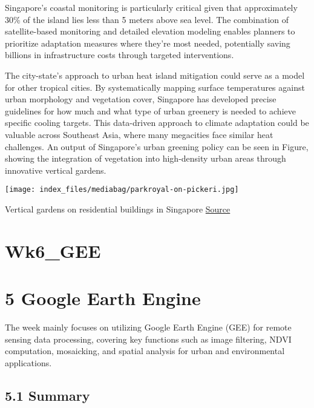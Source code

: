 \documentclass[
  letterpaper,
  DIV=11,
  numbers=noendperiod]{scrreprt}
\begin{document}
Singapore's coastal monitoring is particularly critical given that
approximately 30\% of the island lies less than 5 meters above sea
level. The combination of satellite-based monitoring and detailed
elevation modeling enables planners to prioritize adaptation measures
where they're most needed, potentially saving billions in infrastructure
costs through targeted interventions.

The city-state's approach to urban heat island mitigation could serve as
a model for other tropical cities. By systematically mapping surface
temperatures against urban morphology and vegetation cover, Singapore
has developed precise guidelines for how much and what type of urban
greenery is needed to achieve specific cooling targets. This data-driven
approach to climate adaptation could be valuable across Southeast Asia,
where many megacities face similar heat challenges. An output of
Singapore's urban greening policy can be seen in Figure, showing the
integration of vegetation into high-density urban areas through
innovative vertical gardens.

\texttt{[image: index\_files/mediabag/parkroyal-on-pickeri.jpg]}

Vertical gardens on residential buildings in Singapore
\href{https://www.crabintheair.com/wp-content/uploads/2017/02/parkroyal-on-pickering-review-e1537299078683.jpg}{Source}


\chapter{Wk6\_GEE}\label{wk6_gee}


\chapter{5 Google Earth Engine}\label{google-earth-engine}

The week mainly focuses on utilizing Google Earth Engine (GEE) for
remote sensing data processing, covering key functions such as image
filtering, NDVI computation, mosaicking, and spatial analysis for urban
and environmental applications.

\section{5.1 Summary}\label{summary-3}
\end{document}
